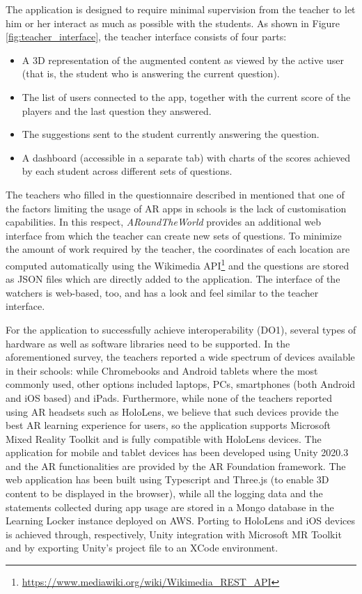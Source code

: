 \documentclass[pdflatex,sn-basic,iicol]{sn-jnl}%
\def\appname/{\textit{ARoundTheWorld}}
\begin{document}
The application is designed to require minimal supervision from the teacher to let him or her interact as much as possible with the students. As shown in Figure \ref{fig:teacher_interface}, the teacher interface consists of four parts:
\begin{itemize}
    \item A 3D representation of the augmented content as viewed by the active user (that is, the student who is answering the current question).
    \item The list of users connected to the app, together with the current score of the players and the last question they answered.
    \item The suggestions sent to the student currently answering the question.
    \item A dashboard (accessible in a separate tab) with charts of the scores achieved by each student across different sets of questions.
\end{itemize} 

The teachers who filled in the questionnaire described in \cite{Masneri2023} mentioned that one of the factors limiting the usage of AR apps in schools is the lack of customisation capabilities. In this respect, \appname/ provides an additional web interface from which the teacher can create new sets of questions. To minimize the amount of work required by the teacher, the coordinates of each location are computed automatically using the Wikimedia API\footnote{\url{https://www.mediawiki.org/wiki/Wikimedia_REST_API}} and the questions are stored as JSON files which are directly added to the application.
The interface of the watchers is web-based, too, and has a look and feel similar to the teacher interface.

For the application to successfully achieve interoperability (DO1), several types of hardware as well as software libraries need to be supported. In the aforementioned survey, the teachers reported a wide spectrum of devices available in their schools: while Chromebooks and Android tablets where the most commonly used, other options included laptops, PCs, smartphones (both Android and iOS based) and iPads. Furthermore, while none of the teachers reported using AR headsets such as HoloLens, we believe that such devices provide the best AR learning experience for users, so the application supports Microsoft Mixed Reality Toolkit and is fully compatible with HoloLens devices. The application for mobile and tablet devices has been developed using Unity 2020.3 and the AR functionalities are provided by the AR Foundation framework. The web application has been built using Typescript and Three.js (to enable 3D content to be displayed in the browser), while all the logging data and the statements collected during app usage are stored in a Mongo database in the Learning Locker instance deployed on AWS. Porting to HoloLens and iOS devices is achieved through, respectively,  Unity integration with Microsoft MR Toolkit and by exporting Unity's project file to an XCode environment.
\end{document}
